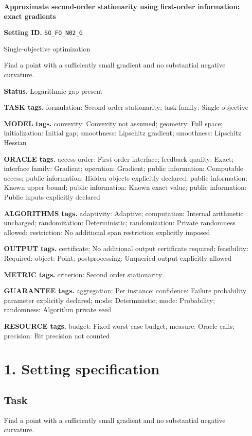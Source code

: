 \documentclass[10pt,a4paper]{article}
\begin{document}
\raggedright

{\LARGE\bfseries\sffamily\color{AtlasNavy} Approximate second-order stationarity using first-order information: exact gradients\par}\vspace{5pt}
\textbf{Setting ID.} \texttt{SO\_\allowbreak{}FO\_\allowbreak{}N02\_\allowbreak{}G}

Single-objective optimization

Find a point with a sufficiently small gradient and no substantial negative curvature.

\textbf{Status.} Logarithmic gap present

\textbf{TASK tags.} formulation: Second order stationarity; task family: Single objective

\textbf{MODEL tags.} convexity: Convexity not assumed; geometry: Full space; initialization: Initial gap; smoothness: Lipschitz gradient; smoothness: Lipschitz Hessian

\textbf{ORACLE tags.} access order: First-order interface; feedback quality: Exact; interface family: Gradient; operation: Gradient; public information: Computable access; public information: Hidden objects explicitly declared; public information: Known upper bound; public information: Known exact value; public information: Public inputs explicitly declared

\textbf{ALGORITHMS tags.} adaptivity: Adaptive; computation: Internal arithmetic uncharged; randomization: Deterministic; randomization: Private randomness allowed; restriction: No additional span restriction explicitly imposed

\textbf{OUTPUT tags.} certificate: No additional output certificate required; feasibility: Required; object: Point; postprocessing: Unqueried output explicitly allowed

\textbf{METRIC tags.} criterion: Second order stationarity

\textbf{GUARANTEE tags.} aggregation: Per instance; confidence: Failure probability parameter explicitly declared; mode: Deterministic; mode: Probability; randomness: Algorithm private seed

\textbf{RESOURCE tags.} budget: Fixed worst-case budget; measure: Oracle calls; precision: Bit precision not counted

\section{1. Setting specification}
\subsection{Task}
Find a point with a sufficiently small gradient and no substantial negative curvature.
\end{document}
